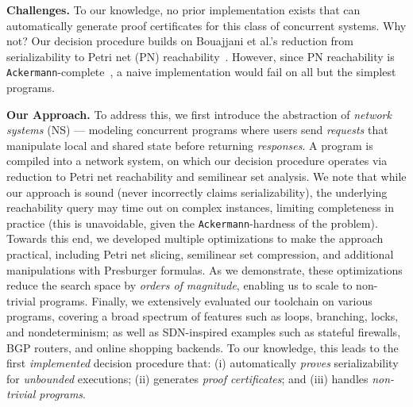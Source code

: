 \smallskip
\noindent
\textbf{Challenges.}
To our knowledge, no prior implementation exists that can automatically generate proof certificates for this class of concurrent systems.
Why not?
Our decision procedure builds on Bouajjani et al.'s reduction from serializability to Petri net (PN) reachability~\cite{BoEmEnHa13}. However, since PN reachability is \texttt{Ackermann}-complete~\cite{CzWo22}, a naive implementation would fail on all but the simplest programs. 

\smallskip
\noindent
\textbf{Our Approach.}
To address this, we first introduce the abstraction of \textit{network systems} (NS) --- modeling concurrent programs where users send \textit{requests} that manipulate local and shared state before returning \textit{responses}. A \toolname{} program is compiled into a network system, on which our decision procedure operates via reduction to Petri net reachability and semilinear set analysis.
%
We note that while our approach is sound (never incorrectly claims serializability), the underlying reachability query may time out on complex instances, limiting completeness in practice (this is unavoidable, given the \texttt{Ackermann}-hardness of the problem).
%
Towards this end, we developed multiple optimizations to make the approach practical, including Petri net slicing, semilinear set compression, and additional manipulations with Presburger formulas.
As we demonstrate, these optimizations reduce the search space by \textit{orders of magnitude}, enabling us to scale to non-trivial programs.
%
Finally, 
we extensively evaluated our \toolname{} toolchain on various programs, covering a broad spectrum of features such as loops, branching, locks, and nondeterminism; as well as SDN-inspired examples such as stateful firewalls, BGP routers, and online shopping backends.
%
To our knowledge, this leads to the first \emph{implemented} decision procedure that: (i) automatically \textit{proves} serializability for \textit{unbounded} executions; (ii) generates \textit{proof certificates}; and (iii) handles \textit{non-trivial programs}.


